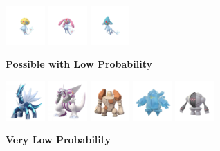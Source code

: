 \documentclass[12pt]{beamer}
\begin{document}
\begin{frame}
\begin{block}{}
\begin{footnotesize}
\begin{center}
 
 \includegraphics[width=1.5cm]{../../images/pokemon/uxie.png}\quad\quad
 \includegraphics[width=1.5cm]{../../images/pokemon/mesprit.png}\quad\quad
 \includegraphics[width=1.5cm]{../../images/pokemon/azelf.png}
 
 
\bigskip\bigskip
 
\textbf{Possible with Low Probability}

 \includegraphics[width=1.5cm]{../../images/pokemon/dialga.png}\quad\quad
 \includegraphics[width=1.5cm]{../../images/pokemon/palkia.png}\quad\quad
 \includegraphics[width=1.5cm]{../../images/pokemon/regirock.png}\quad\quad
 \includegraphics[width=1.5cm]{../../images/pokemon/regice.png}\quad\quad
 \includegraphics[width=1.5cm]{../../images/pokemon/registeel.png}

\bigskip\bigskip

\textbf{Very Low Probability}


\end{center}
\end{footnotesize}
\end{block}
\end{frame}
\end{document}
